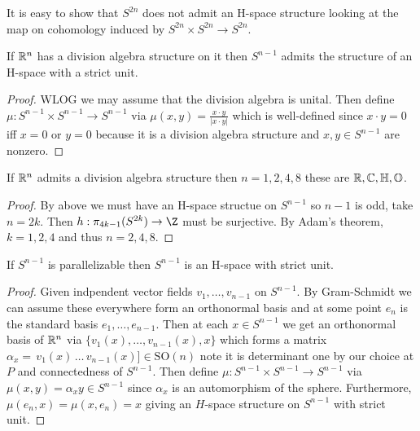 \documentclass[12pt]{extarticle}
\begin{document}
\begin{rmk}
It is easy to show that $S^{2n}$ does not admit an H-space structure looking at the map on cohomology induced by $S^{2n} \times S^{2n} \to S^{2n}$.
\end{rmk}

\begin{theorem}
If $\mathbb{R}^n$ has a division algebra structure on it then $S^{n-1}$ admits the structure of an H-space with a strict unit.
\end{theorem}

\begin{proof}
WLOG we may assume that the division algebra is unital. Then define $\mu  : S^{n-1} \times S^{n-1} \to S^{n-1}$ via $\mu(x,y) = \frac{x \cdot y}{|x \cdot y|}$ which is well-defined since $x \cdot y = 0$ iff $x = 0$ or $y = 0$ because it is a division algebra structure and $x,y \in S^{n-1}$ are nonzero.
\end{proof}

\begin{corollary}
If $\mathbb{R}^n$ admits a division algebra structure then $n = 1,2,4,8$ these are $\mathbb{R}, \mathbb{C}, \mathbb{H}, \mathbb{O}$.
\end{corollary}

\begin{proof}
By above we must have an H-space structue on $S^{n-1}$ so $n-1$ is odd, take $n = 2k$. Then $h : \pi_{4k - 1}(S^{2k}) \to \Z$ must be surjective. By Adam's theorem, $k = 1,2,4$ and thus $n = 2,4,8$. 
\end{proof}

\begin{cor}
If $S^{n-1}$ is parallelizable then $S^{n-1}$ is an H-space with strict unit.
\end{cor}

\begin{proof}
Given indpendent vector fields $v_1, \dots, v_{n-1}$ on $S^{n-1}$. By Gram-Schmidt we can assume these everywhere form an orthonormal basis and at some point $e_n$ is the standard basis $e_1, \dots, e_{n-1}$. Then at each $x \in S^{n-1}$ we get an orthonormal basis of $\mathbb{R}^n$ via $\{v_1(x), \dots, v_{n-1}(x), x \}$ which forms a matrix $\alpha_x =  \, v_1(x) \, \dots \, v_{n-1}(x)] \in \mathrm{SO}(n)$ note it is determinant one by our choice at $P$ and connectedness of $S^{n-1}$. Then define $\mu : S^{n-1} \times S^{n-1} \to S^{n-1}$ via $\mu(x,y) = \alpha_x y \in S^{n-1}$ since $\alpha_x$ is an automorphism of the sphere. Furthermore, $\mu(e_n, x) = \mu(x, e_n) = x$ giving an $H$-space structure on $S^{n-1}$ with strict unit. 
\end{proof}
\end{document}
